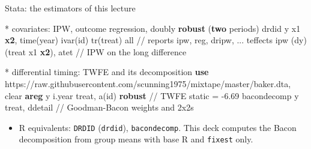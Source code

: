 \documentclass[
  11pt,
  ignorenonframetext,
  aspectratio=169,
]{beamer}
\newenvironment{Shaded}{\begin{snugshade}}{\end{snugshade}}
\newcommand{\CommentTok}[1]{\textcolor[rgb]{0.37,0.37,0.37}{#1}}
\newcommand{\FunctionTok}[1]{\textcolor[rgb]{0.28,0.35,0.67}{#1}}
\newcommand{\KeywordTok}[1]{\textcolor[rgb]{0.00,0.23,0.31}{\textbf{#1}}}
\newcommand{\NormalTok}[1]{\textcolor[rgb]{0.00,0.23,0.31}{#1}}
\newcommand{\OtherTok}[1]{\textcolor[rgb]{0.00,0.23,0.31}{#1}}
\providecommand{\tightlist}{%
  \setlength{\itemsep}{0pt}\setlength{\parskip}{0pt}}
\begin{document}
\begin{frame}[fragile]{Stata: the estimators of this lecture}
\protect{}\label{stata-the-estimators-of-this-lecture}
\begin{Shaded}
\begin{Highlighting}[]
\NormalTok{* covariates: IPW, outcome regression, doubly }\KeywordTok{robust}\NormalTok{ (}\KeywordTok{two}\NormalTok{ periods)}
\NormalTok{drdid }\FunctionTok{y}\NormalTok{ x1 }\KeywordTok{x2}\NormalTok{, time(}\FunctionTok{year}\NormalTok{) ivar(id) tr(treat) }\OtherTok{all}     \CommentTok{// reports ipw, reg, dripw, ...}
\NormalTok{teffects ipw (dy) (treat x1 }\KeywordTok{x2}\NormalTok{), atet                 }\CommentTok{// IPW on the long difference}

\NormalTok{* differential timing: TWFE and its decomposition}
\KeywordTok{use}\NormalTok{ https:}\CommentTok{//raw.githubusercontent.com/scunning1975/mixtape/master/baker.dta, clear}
\KeywordTok{areg} \FunctionTok{y}\NormalTok{ i.}\FunctionTok{year}\NormalTok{ treat, a(id) }\KeywordTok{robust}                     \CommentTok{// TWFE static = {-}6.69}
\NormalTok{bacondecomp }\FunctionTok{y}\NormalTok{ treat, ddetail                          }\CommentTok{// Goodman{-}Bacon weights and 2x2s}
\end{Highlighting}
\end{Shaded}

\begin{itemize}
\tightlist
\item
  R equivalents: \texttt{DRDID} (\texttt{drdid}), \texttt{bacondecomp}.
  This deck computes the Bacon decomposition from group means with base
  R and \texttt{fixest} only.
\end{itemize}
\end{frame}
\end{document}
